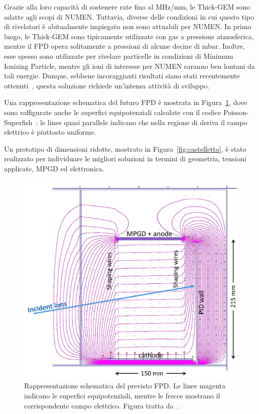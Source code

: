 Grazie alla loro capacità di sostenere rate fino al MHz/mm, le Thick-GEM sono adatte agli scopi di NUMEN.
Tuttavia, diverse delle condizioni in cui questo tipo di rivelatori è abitualmente impiegato non sono attuabili per NUMEN. 
In primo luogo, le Thick-GEM sono tipicamente utilizzate con gas a pressione atmosferica, mentre il FPD opera solitamente a pressioni di alcune decine di mbar.
Inoltre, esse spesso sono utilizzate per rivelare particelle in condizioni di Minimum Ionizing Particle, mentre gli ioni di interesse per NUMEN saranno ben lontani da tali energie.
Dunque, sebbene incoraggianti risultati siano stati recentemente ottenuti~\cite{cortesi:rsi17}, questa soluzione richiede un'intensa attività di sviluppo.


Una rappresentazione schematica del futuro FPD è mostrata in Figura~\ref{fig:nuovo_fpd}, dove sono raffigurate anche le superfici equipotenziali calcolate con il codice Poisson-Superfish~\cite{superfish:87}: le linee quasi parallele indicano che nella regione di deriva il campo elettrico è piuttosto uniforme.


Un prototipo di dimensioni ridotte, mostrato in Figura~\ref{fig:castelletto}, è stato realizzato per individuare le migliori soluzioni in termini di geometria, tensioni applicate, MPGD ed elettronica.




\begin{figure} [!t]
	\centering
	\includegraphics[scale=0.3]{Grafici/nuovo_fpd.png}
	\caption{Rappresentazione schematica del previsto FPD. Le linee magenta indicano le superfici equipotenziali, mentre le frecce mostrano il corrispondente campo elettrico. Figura tratta da~\cite{cappuzzello:epja18}.} \label{fig:nuovo_fpd}
\end{figure}

